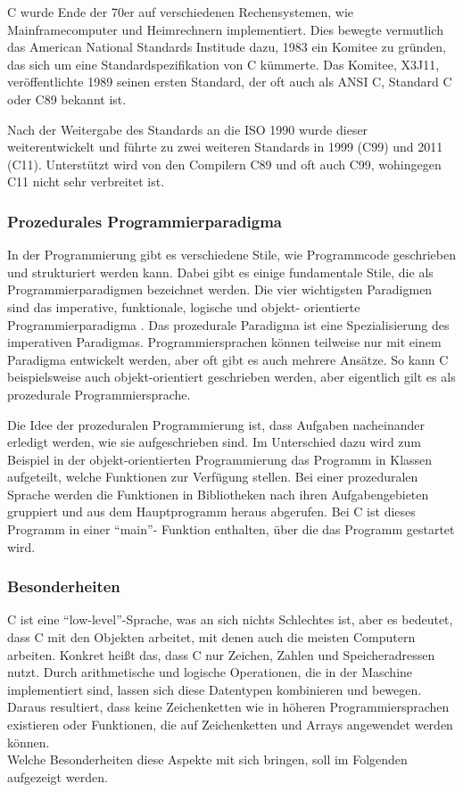   C wurde Ende der 70er auf verschiedenen Rechensystemen, wie Mainframecomputer und
  Heimrechnern implementiert. Dies bewegte vermutlich das American National Standards
  Institude dazu, 1983 ein Komitee zu gründen, das sich um eine Standardspezifikation von
  C kümmerte. Das Komitee, X3J11, veröffentlichte 1989 seinen ersten Standard, der oft auch
  als ANSI C, Standard C oder C89 bekannt ist.
  
  Nach der Weitergabe des Standards an die \ac{ISO} 1990 wurde dieser weiterentwickelt und
  führte zu zwei weiteren Standards in 1999 (C99) und 2011 (C11). Unterstützt wird von den
  Compilern C89 und oft auch C99, wohingegen C11 nicht sehr verbreitet ist. \nocite{ritchie93}
 
 \subsubsection[Prozedurales Programmierparadigma (Heumann)]{Prozedurales Programmierparadigma}
  In der Programmierung gibt es verschiedene Stile, wie Programmcode geschrieben und strukturiert
  werden kann. Dabei gibt es einige fundamentale Stile, die als Programmierparadigmen bezeichnet
  werden. Die vier wichtigsten Paradigmen sind das imperative, funktionale, logische und objekt-
  orientierte Programmierparadigma \cite{normark03}. Das prozedurale Paradigma ist eine Spezialisierung des 
  imperativen Paradigmas. Programmiersprachen können teilweise nur mit einem Paradigma entwickelt
  werden, aber oft gibt es auch mehrere Ansätze. So kann C beispielsweise auch objekt-orientiert
  geschrieben werden, aber eigentlich gilt es als prozedurale Programmiersprache.
  
  Die Idee der prozeduralen Programmierung ist, dass Aufgaben nacheinander erledigt werden, wie
  sie aufgeschrieben sind. Im Unterschied dazu wird zum Beispiel in der objekt-orientierten
  Programmierung das Programm in Klassen aufgeteilt, welche Funktionen zur Verfügung stellen. Bei
  einer prozeduralen Sprache werden die Funktionen in Bibliotheken nach ihren Aufgabengebieten
  gruppiert und aus dem Hauptprogramm heraus abgerufen. Bei C ist dieses Programm in einer ``main''-
  Funktion enthalten, über die das Programm gestartet wird.

 \subsubsection[Besonderheiten (Heumann)]{Besonderheiten}
 C ist eine ``low-level''-Sprache, was an sich nichts Schlechtes ist, aber es bedeutet, dass C mit den
 Objekten arbeitet, mit denen auch die meisten Computern arbeiten. Konkret heißt das, dass
 C nur Zeichen, Zahlen und Speicheradressen nutzt. Durch arithmetische und logische Operationen,
 die in der Maschine implementiert sind, lassen sich diese Datentypen kombinieren und bewegen.
 Daraus resultiert, dass keine Zeichenketten wie in höheren Programmiersprachen existieren oder
 Funktionen, die auf Zeichenketten und Arrays angewendet werden können. \cite{kernighan88} \\
 Welche Besonderheiten diese Aspekte mit sich bringen, soll im Folgenden aufgezeigt werden.

